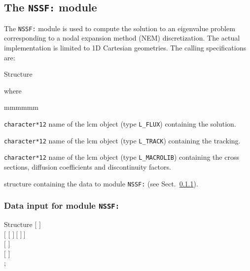 \clearpage

\subsection{The {\tt NSSF:} module}

The {\tt NSSF:} module is used to compute the solution to an eigenvalue problem corresponding to a nodal expansion method (NEM) discretization. The actual implementation is limited to
1D Cartesian geometries. The calling specifications are:

\begin{DataStructure}{Structure }
 \moc{:=}    \moc{::} 
\end{DataStructure}

\noindent where
\begin{ListeDeDescription}{mmmmmm}

\item[\dusa{FLUX}] {\tt character*12} name of the {\sc lcm} object (type {\tt L\_FLUX}) containing the solution.

\item[\dusa{TRACK}] {\tt character*12} name of the {\sc lcm} object (type {\tt L\_TRACK}) containing the {\sc tracking}.

\item[\dusa{MACRO}] {\tt character*12} name of the {\sc lcm} object (type {\tt L\_MACROLIB}) containing the cross sections, diffusion coefficients and discontinuity
factors.

\item[\dstr{NSSF\_data}] structure containing the data to module {\tt NSSF:} (see Sect.~\ref{sect:fld_data}).

\end{ListeDeDescription}

\vskip 0.2cm

\subsubsection{Data input for module {\tt NSSF:}}\label{sect:fld_data}

\begin{DataStructure}{Structure }
$[$   $]$ \\
$[$   $[$  $]~[$  $]~]$ \\
$[$  $]$ \\
$[$   $]$  \\
;
\end{DataStructure}

